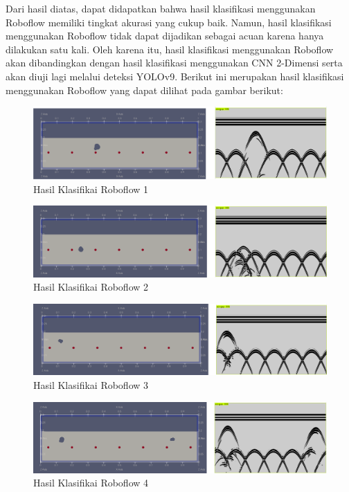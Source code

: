 Dari hasil diatas, dapat didapatkan bahwa hasil klasifikasi menggunakan Roboflow memiliki tingkat akurasi yang cukup baik. Namun, hasil klasifikasi menggunakan Roboflow tidak dapat dijadikan sebagai acuan karena hanya dilakukan satu kali. Oleh karena itu, hasil klasifikasi menggunakan Roboflow akan dibandingkan dengan hasil klasifikasi menggunakan CNN 2-Dimensi serta akan diuji lagi melalui deteksi YOLOv9. Berikut ini merupakan hasil klasifikasi menggunakan Roboflow yang dapat dilihat pada gambar berikut:

\begin{figure} [H] \centering
    \includegraphics[scale=0.2]{gambar/bab4/robo1.png}
    \caption{Hasil Klasifikai Roboflow 1}
\end{figure}

\begin{figure} [H] \centering
    \includegraphics[scale=0.2]{gambar/bab4/robo2.png}
    \caption{Hasil Klasifikai Roboflow 2}
\end{figure}

\begin{figure} [H] \centering
    \includegraphics[scale=0.2]{gambar/bab4/robo3.png}
    \caption{Hasil Klasifikai Roboflow 3}
\end{figure}

\begin{figure} [H] \centering
    \includegraphics[scale=0.2]{gambar/bab4/robo4.png}
    \caption{Hasil Klasifikai Roboflow 4}
\end{figure}

